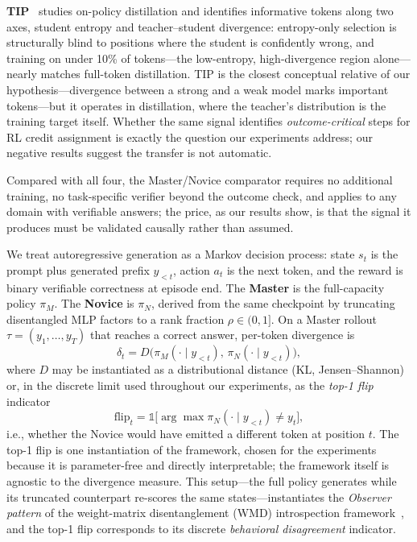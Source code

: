 \documentclass[times, 10pt,twocolumn]{article}
\begin{document}
\textbf{TIP}~\cite{xu2026tip} studies on-policy distillation and identifies
informative tokens along two axes, student entropy and teacher--student
divergence: entropy-only selection is structurally blind to positions where
the student is confidently wrong, and training on under 10\% of tokens---the
low-entropy, high-divergence region alone---nearly matches full-token
distillation. TIP is the closest conceptual
relative of our hypothesis---divergence between a strong and a weak model marks
important tokens---but it operates in distillation, where the teacher's
distribution is the training target itself. Whether the same signal identifies
\emph{outcome-critical} steps for RL credit assignment is exactly the question
our experiments address; our negative results suggest the transfer is not
automatic.

Compared with all four, the Master/Novice comparator requires no additional
training, no task-specific verifier beyond the outcome check, and applies to
any domain with verifiable answers; the price, as our results show, is that the
signal it produces must be validated causally rather than assumed.



\label{sec:hypothesis}

We treat autoregressive generation as a Markov decision process: state $s_t$ is
the prompt plus generated prefix $y_{<t}$, action $a_t$ is the next token, and
the reward is binary verifiable correctness at episode end. The
\textbf{Master} is the full-capacity policy $\pi_M$. The \textbf{Novice} is
$\pi_N$, derived from the same checkpoint by truncating disentangled MLP
factors to a rank fraction $\rho \in (0,1]$. On a Master rollout
$\tau = (y_1,\ldots,y_T)$ that reaches a correct answer, per-token divergence
is
\begin{equation}
\delta_t = D\bigl(\pi_M(\cdot \mid y_{<t}),\, \pi_N(\cdot \mid y_{<t})\bigr),
\end{equation}
where $D$ may be instantiated as a distributional distance (KL, Jensen--Shannon)
or, in the discrete limit used throughout our experiments, as the
\emph{top-1 flip} indicator
\begin{equation}
\mathrm{flip}_t = \mathbb{1}\bigl[\arg\max \pi_N(\cdot \mid y_{<t}) \neq y_t\bigr],
\end{equation}
i.e., whether the Novice would have emitted a different token at position $t$.
The top-1 flip is one instantiation of the framework, chosen for the
experiments because it is parameter-free and directly interpretable; the
framework itself is agnostic to the divergence measure. This setup---the full
policy generates while its truncated counterpart re-scores the same
states---instantiates the \emph{Observer pattern} of the weight-matrix
disentanglement (WMD) introspection framework~\cite{till2026introspection},
and the top-1 flip corresponds to its discrete \emph{behavioral disagreement}
indicator.
\end{document}
